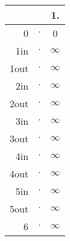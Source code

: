 \documentclass{article}
\begin{document}
\begin{center}
\begin{tabular}{|r||c@{\,}c|}
\hline
 & & 1.\\
\hline
0 & $\cdot$ & 0\\
\hline
1in & $\cdot$ & $\infty$\\
\hline
1out & $\cdot$ & $\infty$\\
\hline
2in & $\cdot$ & $\infty$\\
\hline
2out & $\cdot$ & $\infty$\\
\hline
3in & $\cdot$ & $\infty$\\
\hline
3out & $\cdot$ & $\infty$\\
\hline
4in & $\cdot$ & $\infty$\\
\hline
4out & $\cdot$ & $\infty$\\
\hline
5in & $\cdot$ & $\infty$\\
\hline
5out & $\cdot$ & $\infty$\\
\hline
6 & $\cdot$ & $\infty$\\
\hline
\end{tabular}
\end{center}
\end{document}
